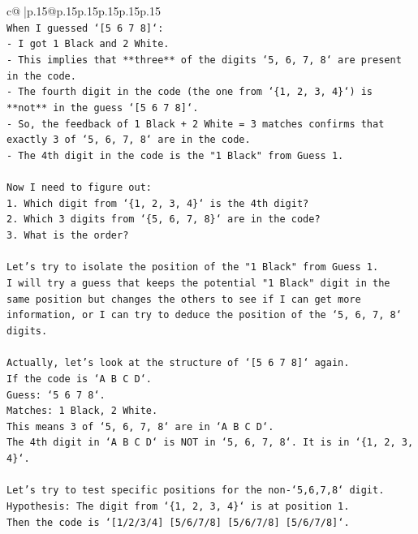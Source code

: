 \documentclass{article}
\begin{document}
{\begin{supertabular}{c@{$\;$}|p{.15\linewidth}@{}p{.15\linewidth}p{.15\linewidth}p{.15\linewidth}p{.15\linewidth}p{.15\linewidth}}
{{{\\ 
\texttt{When I guessed `{[}5 6 7 8{]}`:} \\
\texttt{{-} I got 1 Black and 2 White.} \\
\texttt{{-} This implies that **three** of the digits `5, 6, 7, 8` are present in the code.} \\
\texttt{{-} The fourth digit in the code (the one from `\{1, 2, 3, 4\}`) is **not** in the guess `{[}5 6 7 8{]}`.} \\
\texttt{{-} So, the feedback of 1 Black + 2 White = 3 matches confirms that exactly 3 of `5, 6, 7, 8` are in the code.} \\
\texttt{{-} The 4th digit in the code is the "1 Black" from Guess 1.} \\
\\ 
\texttt{Now I need to figure out:} \\
\texttt{1. Which digit from `\{1, 2, 3, 4\}` is the 4th digit?} \\
\texttt{2. Which 3 digits from `\{5, 6, 7, 8\}` are in the code?} \\
\texttt{3. What is the order?} \\
\\ 
\texttt{Let's try to isolate the position of the "1 Black" from Guess 1.} \\
\texttt{I will try a guess that keeps the potential "1 Black" digit in the same position but changes the others to see if I can get more information, or I can try to deduce the position of the `5, 6, 7, 8` digits.} \\
\\ 
\texttt{Actually, let's look at the structure of `{[}5 6 7 8{]}` again.} \\
\texttt{If the code is `A B C D`.} \\
\texttt{Guess: `5 6 7 8`.} \\
\texttt{Matches: 1 Black, 2 White.} \\
\texttt{This means 3 of `5, 6, 7, 8` are in `A B C D`.} \\
\texttt{The 4th digit in `A B C D` is NOT in `5, 6, 7, 8`. It is in `\{1, 2, 3, 4\}`.} \\
\\ 
\texttt{Let's try to test specific positions for the non{-}`5,6,7,8` digit.} \\
\texttt{Hypothesis: The digit from `\{1, 2, 3, 4\}` is at position 1.} \\
\texttt{Then the code is `{[}1/2/3/4{]} {[}5/6/7/8{]} {[}5/6/7/8{]} {[}5/6/7/8{]}`.} \\
}}}
\end{supertabular}}
\end{document}
